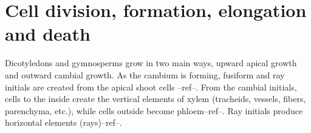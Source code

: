\section{Cell division, formation, elongation and death}
Dicotyledons and gymnosperms grow in two main ways, upward apical growth and
outward cambial growth.  As the cambium is forming, fusiform and ray initials
are created from the apical shoot cells --ref--. From the cambial initials,
cells to the inside create the vertical elements of xylem (tracheids, vessels,
fibers, parenchyma, etc.), while cells outside become phloem--ref--. Ray
initials produce horizontal elements (rays)--ref--.